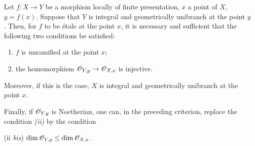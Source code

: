 \begin{theorem}[18.10.1]
\label{IV.18.10.1}
Let $f:X\to Y$ be a morphism locally of finite presentation, $x$ a point of $X$, $y=f(x)$.
Suppose that $Y$ is integral and geometrically unibranch at the point $y$.
Then, for $f$ to be \'etale at the point $x$, it is necessary and sufficient that the following two conditions be satisfied:
\begin{enumerate}[label=\emph{\roman*)}]
  \item $f$ is unramified at the point $x$;
  \item the homomorphism $\mathscr{O}_{Y,y}\to\mathscr{O}_{X,x}$ is injective.
\end{enumerate}

Moreover, if this is the case, $X$ is integral and geometrically unibranch at the point $x$.

Finally, if $\mathscr{O}_{Y,y}$ is Noetherian, one can, in the preceding criterion, replace the condition \emph{(ii)} by the condition

\textup{(ii \emph{bis})} $\dim\mathscr{O}_{Y,y}\leq\dim\mathscr{O}_{X,x}$.
\end{theorem}

